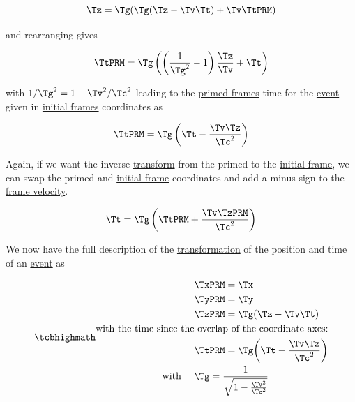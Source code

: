 \begin{equation}
	{\Tz } = \Tg  ( \Tg  ({\Tz }-{\Tv }{\Tt }) + {\Tv } \TtPRM )
\end{equation}

and rearranging gives

\begin{equation}
	\TtPRM  = \Tg  \left( \left( \dfrac{1}{\Tg ^2} -1 \right)\frac{\Tz }{\Tv } + \Tt  \right)
\end{equation}

with $1/{\Tg }^2 = 1-{\Tv }^2/{\Tc }^2$ leading to the \hyperlink{def-Primed-Frame}{primed frames} time for the \hyperlink{def-event}{event} given in \hyperlink{def-initial-Frame}{initial frames} coordinates as

\begin{equation}
	\TtPRM  = \Tg  \left( \Tt -\dfrac{\Tv  \Tz }{\Tc ^2} \right)
\end{equation}

Again, if we want the inverse \hyperlink{def-transform}{transform} from the primed to the \hyperlink{def-initial-Frame}{initial frame}, we can swap the primed and \hyperlink{def-initial-Frame}{initial frame} coordinates and add a minus sign to the \hyperlink{def-frame-velocity}{frame velocity}.

\begin{equation}
	{\Tt } = \Tg  \left( \TtPRM +\dfrac{\Tv  \TzPRM }{\Tc ^2} \right)
\end{equation}

We now have the full description of the \hyperlink{def-transform}{transformation} of the position and time of an \hyperlink{def-event}{event} as

\begin{equation}
	\mhl{
		\begin{aligned}
			 & {\TxPRM  } = \Tx                                            \\
			 & {\TyPRM  } = \Ty                                            \\
			 & {\TzPRM  } = \Tg  ({\Tz }-{\Tv }{\Tt })                       \\
			\text{with the time since the}&\text{ overlap of the coordinate axes:} \\
			& \TtPRM  = \Tg  \bigg(\Tt -\frac{ {\Tv }{\Tz } }{ \Tc ^2}\bigg) \\
			\text{with }\quad&  \Tg  = \dfrac{1}{\sqrt{1-\frac{ {\Tv }^2}{ \Tc ^2} } }
		\end{aligned}
	}
	\label{eq: Lorentz transformation}
\end{equation}

